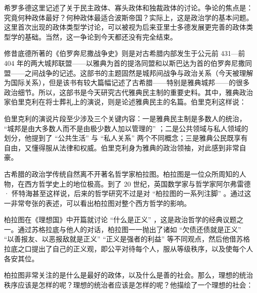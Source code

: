希罗多德这里记述了关于民主政体、寡头政体和独裁政体的讨论。争论的焦点是：究竟何种政体最好？何种政体最适合波斯帝国？实际上，这是政治学的基本问题。这里首次出现的政体类型学讨论，可以被视为后来亚里士多德发展更完善的政体类型学的基础。当然，这一争论到今天都还没有完全结束。

修昔底德所著的《伯罗奔尼撒战争史》则是对古希腊内部发生于公元前 431—前 404 年的两大城邦联盟——以雅典为首的提洛同盟和以斯巴达为首的伯罗奔尼撒同盟——之间战争的记述。这部书的主题固然是城邦间战争与政治关系（今天被理解为国际关系），但是该书有较大篇幅记述了古希腊——特别是雅典城邦——的很多政治细节。所以，这部书是今天研究古代雅典民主制的重要史料。其中，雅典政治家伯里克利在将士葬礼上的演说，则是论述雅典民主的名篇。伯里克利这样说：


伯里克利的演说片段至少涉及三个关键内容：一是雅典民主制是多数人的统治， “城邦是由大多数人而不是由极少数人加以管理的” ；二是公共领域与私人领域的划分，他提到了 “公共生活” 与 “私人关系” 两个不同概念；三是雅典公民既享有自由，又懂得服从法律和权威。伯里克利身为雅典的政治领袖，对此感到非常自豪。

古希腊的政治学传统自然离不开著名哲学家柏拉图。柏拉图是一位众所周知的人物，在西方哲学史上的地位极高。到了 20 世纪，英国数学家与哲学家阿尔弗雷德 · 怀特海甚至这样说，后来的哲学研究不过是对 “柏拉图的一系列注脚” 。通过这一非常夸张的表述，可以看出柏拉图对整个西方哲学的影响。

柏拉图在《理想国》中开篇就讨论 “什么是正义” ，这是政治哲学的经典议题之一。通过苏格拉底与他人的对话，柏拉图一一抛出了诸如 “欠债还债就是正义”  “以善报友、以恶报敌就是正义”  “正义是强者的利益” 等不同观点，然后他借苏格拉底之口提出了自己的正义观，即公平对待每个人，服从等级秩序，以及使每个人各安其位。

柏拉图非常关注的是什么是最好的政体，以及什么是善的社会。那么，理想的统治秩序应该是怎样的呢？理想的统治者应该是怎样的呢？他描绘了一个理想的社会：

